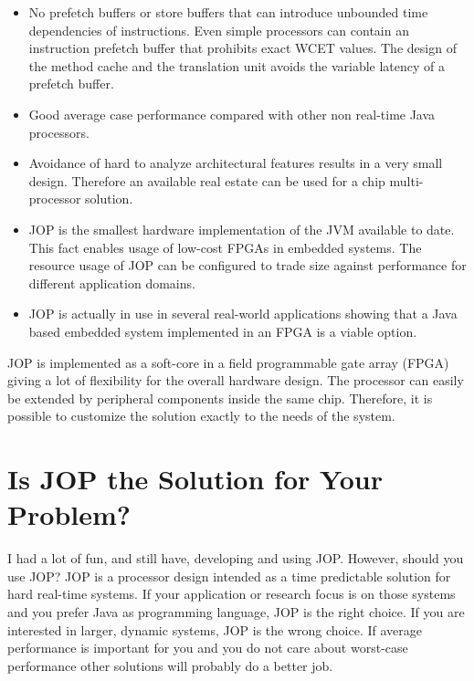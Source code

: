 \begin{itemize}
    \item No prefetch buffers or store buffers that can introduce
        unbounded time dependencies of instructions. Even simple
        processors can contain an instruction prefetch buffer
        that prohibits exact WCET values. The design of the
        method cache and the translation unit avoids the variable
        latency of a prefetch buffer.

    \item Good average case performance compared with other non
        real-time Java processors.

    \item Avoidance of hard to analyze architectural features
        results in a very small design. Therefore an available
        real estate can be used for a chip multi-processor
        solution.

    \item JOP is the smallest hardware implementation of the JVM
        available to date. This fact enables usage of low-cost
        FPGAs in embedded systems. The resource usage of JOP can
        be configured to trade size against performance for
        different application domains.


    \item JOP is actually in use in several real-world
        applications showing that a Java based embedded system
        implemented in an FPGA is a viable option.

\end{itemize}

JOP is implemented as a soft-core in a field programmable gate array
(FPGA) giving a lot of flexibility for the overall hardware design.
The processor can easily be extended by peripheral components inside
the same chip. Therefore, it is possible to customize the solution
exactly to the needs of the system.


\section{Is JOP the Solution for Your Problem?}

I had a lot of fun, and still have, developing and using JOP.
However, should you use JOP? JOP is a processor design intended as a
time predictable solution for hard real-time systems. If your
application or research focus is on those systems and you prefer Java
as programming language, JOP is the right choice. If you are
interested in larger, dynamic systems, JOP is the wrong choice. If
average performance is important for you and you do not care about
worst-case performance other solutions will probably do a better job.

